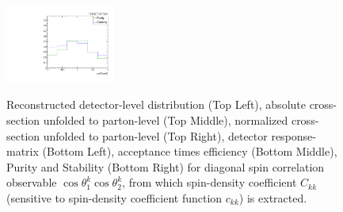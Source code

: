 \begin{figure}[htb]
\begin{center}
 \includegraphics[width=0.32\textwidth]{fig_fullRun2UL/unfolding/combined/PurStab_c_kk.pdf} \\
\caption{Reconstructed detector-level distribution (Top Left), absolute cross-section unfolded to parton-level (Top Middle), normalized cross-section unfolded to parton-level (Top Right), detector response-matrix (Bottom Left), acceptance times efficiency (Bottom Middle), Purity and Stability (Bottom Right) for diagonal spin correlation observable $\cos\theta_{1}^{k}\cos\theta_{2}^{k}$, from which spin-density coefficient $C_{kk}$ (sensitive to spin-density coefficient function $c_{k k}$) is extracted.}
\label{fig:c_kk}
\end{center}
\end{figure}
\clearpage

